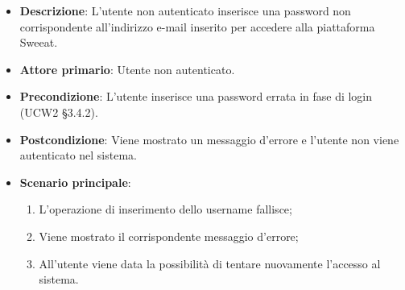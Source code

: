\begin{itemize}
\item \textbf{Descrizione}: L'utente non autenticato inserisce una password non corrispondente all'indirizzo e-mail inserito per accedere alla piattaforma Sweeat.
\item \textbf{Attore primario}: Utente non autenticato.
\item \textbf{Precondizione}: L'utente inserisce una password errata in fase di login (UCW2 §3.4.2).
\item \textbf{Postcondizione}: Viene mostrato un messaggio d'errore e l'utente non viene autenticato nel sistema.

\item \textbf{Scenario principale}:
\begin{enumerate}
\item L'operazione di inserimento dello username fallisce;
\item Viene mostrato il corrispondente messaggio d'errore;
\item All'utente viene data la possibilità di tentare nuovamente l'accesso al sistema.
\end{enumerate}
\end{itemize}

